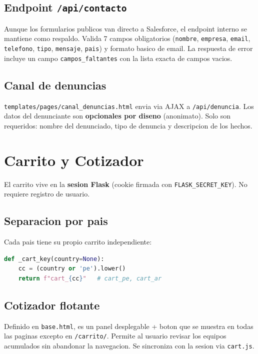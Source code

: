 \documentclass[11pt,a4paper]{article}
\begin{document}
\subsection{Endpoint \texttt{/api/contacto}}

Aunque los formularios publicos van directo a Salesforce, el endpoint
interno se mantiene como respaldo. Valida 7 campos obligatorios
(\texttt{nombre}, \texttt{empresa}, \texttt{email}, \texttt{telefono},
\texttt{tipo}, \texttt{mensaje}, \texttt{pais}) y formato basico de email.
La respuesta de error incluye un campo \texttt{campos\_faltantes} con la
lista exacta de campos vacios.

\subsection{Canal de denuncias}

\texttt{templates/pages/canal\_denuncias.html} envia via AJAX a
\texttt{/api/denuncia}. Los datos del denunciante son \textbf{opcionales por
diseno} (anonimato). Solo son requeridos: nombre del denunciado, tipo de
denuncia y descripcion de los hechos.

\section{Carrito y Cotizador}

El carrito vive en la \textbf{sesion Flask} (cookie firmada con
\texttt{FLASK\_SECRET\_KEY}). No requiere registro de usuario.

\subsection{Separacion por pais}

Cada pais tiene su propio carrito independiente:

\begin{lstlisting}[language=Python]
def _cart_key(country=None):
    cc = (country or 'pe').lower()
    return f"cart_{cc}"   # cart_pe, cart_ar
\end{lstlisting}

\subsection{Cotizador flotante}

Definido en \texttt{base.html}, es un panel desplegable + boton que se
muestra en todas las paginas excepto en \texttt{/carrito/}. Permite al
usuario revisar los equipos acumulados sin abandonar la navegacion. Se
sincroniza con la sesion via \texttt{cart.js}.
\end{document}
